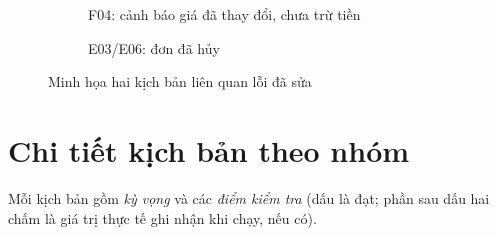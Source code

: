 \documentclass[a4paper,11pt]{article}
\begin{document}
\begin{figure}[H]\centering
\begin{subfigure}{0.46\textwidth}\caption{F04: cảnh báo giá đã thay đổi, chưa trừ tiền}\end{subfigure}\hfill
\begin{subfigure}{0.46\textwidth}\caption{E03/E06: đơn đã hủy}\end{subfigure}
\caption{Minh họa hai kịch bản liên quan lỗi đã sửa}\end{figure}

\section{Chi tiết kịch bản theo nhóm}
Mỗi kịch bản gồm \emph{kỳ vọng} và các \emph{điểm kiểm tra} (dấu \tick{} là đạt; phần sau dấu hai chấm là giá trị thực tế ghi nhận khi chạy, nếu có).
\end{document}
